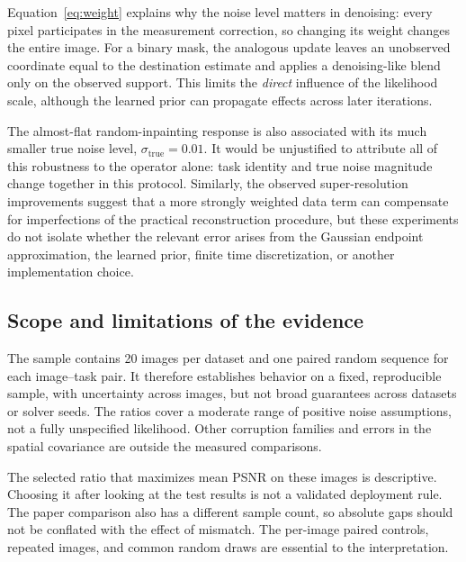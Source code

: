 \documentclass[10pt,letterpaper]{article}
\newcommand{\st}{\sigma_{\mathrm{true}}}
\begin{document}
Equation~\eqref{eq:weight} explains why the noise level matters in denoising: every pixel participates in the measurement correction, so changing its weight changes the entire image. For a binary mask, the analogous update leaves an unobserved coordinate equal to the destination estimate and applies a denoising-like blend only on the observed support. This limits the \emph{direct} influence of the likelihood scale, although the learned prior can propagate effects across later iterations.

The almost-flat random-inpainting response is also associated with its much smaller true noise level, $\st=0.01$. It would be unjustified to attribute all of this robustness to the operator alone: task identity and true noise magnitude change together in this protocol. Similarly, the observed super-resolution improvements suggest that a more strongly weighted data term can compensate for imperfections of the practical reconstruction procedure, but these experiments do not isolate whether the relevant error arises from the Gaussian endpoint approximation, the learned prior, finite time discretization, or another implementation choice.

\subsection{Scope and limitations of the evidence}
The sample contains 20 images per dataset and one paired random sequence for each image--task pair. It therefore establishes behavior on a fixed, reproducible sample, with uncertainty across images, but not broad guarantees across datasets or solver seeds. The ratios cover a moderate range of positive noise assumptions, not a fully unspecified likelihood. Other corruption families and errors in the spatial covariance are outside the measured comparisons.

The selected ratio that maximizes mean PSNR on these images is descriptive. Choosing it after looking at the test results is not a validated deployment rule. The paper comparison also has a different sample count, so absolute gaps should not be conflated with the effect of mismatch. The per-image paired controls, repeated images, and common random draws are essential to the interpretation.
\end{document}
